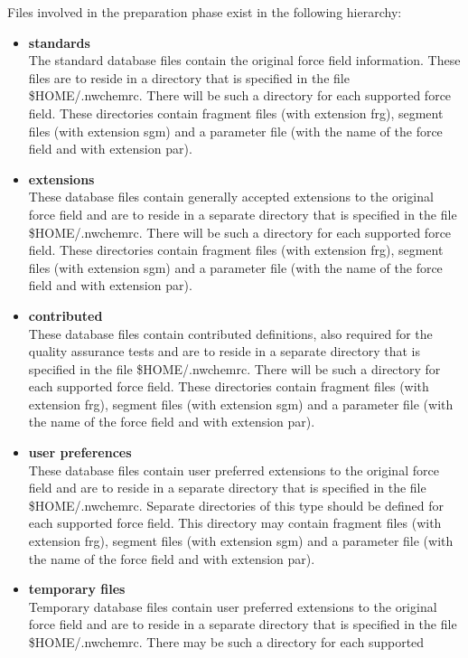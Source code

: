 Files involved in the preparation phase exist in the following hierarchy:
\begin{itemize}
\item[{\bf *}]
{\bf standards}\\
The standard database files contain the original force field information.
These files are to reside in a directory that is specified in the file 
\$HOME/.nwchemrc. There will be such a directory for each supported force 
field. These directories contain fragment files (with extension frg),
segment files (with extension sgm) and a parameter file (with the name
of the force field and with extension par).
\item[{\bf *}]
{\bf extensions}\\
These database files contain generally accepted extensions to the original
force field and are to reside in a separate directory that is specified in 
the file \$HOME/.nwchemrc. There will be such a directory for each supported 
force field. These directories contain fragment files (with extension frg),
segment files (with extension sgm) and a parameter file (with the name
of the force field and with extension par).
\item[{\bf *}]
{\bf contributed}\\
These database files contain contributed definitions, also required for 
the quality assurance tests and are to reside in a separate directory 
that is specified in the file \$HOME/.nwchemrc. 
There will be such a directory for each supported 
force field. These directories contain fragment files (with extension frg),
segment files (with extension sgm) and a parameter file (with the name
of the force field and with extension par).
\item[{\bf *}]
{\bf user preferences}\\
These database files contain user preferred extensions to the original
force field and are to reside in a separate directory that is specified in 
the file \$HOME/.nwchemrc. Separate directories of this type  should be 
defined for each supported force field. 
This directory may contain fragment files (with extension frg),
segment files (with extension sgm) and a parameter file (with the name
of the force field and with extension par).
\item[{\bf *}]
{\bf temporary files}\\
Temporary database files contain user preferred extensions to the original
force field and are to reside in a separate directory that is specified in 
the file \$HOME/.nwchemrc. There may  be such a directory for each supported 

\end{itemize}
